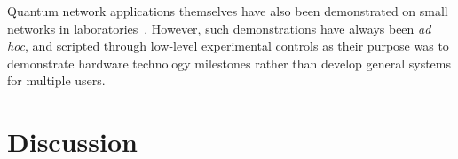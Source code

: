 Quantum network applications themselves have also been demonstrated on small networks in
laboratories~\cite{barz_2012_demonstration}. However, such demonstrations have always been \emph{ad
hoc}, and scripted through low-level experimental controls as their purpose was to demonstrate
hardware technology milestones rather than develop general systems for multiple users.

\section{Discussion}

\noindent
{}

\begin{xstretch}
\printbibliography[heading=subbibintoc,title={References},notcategory=noprint]
\end{xstretch}
